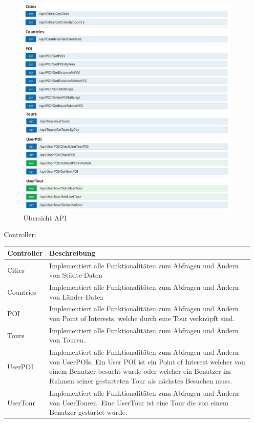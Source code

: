 \documentclass[a4paper,10pt,xetex]{article}
\begin{document}
\begin{figure}
  \centering
  \includegraphics{swagger}
  \caption{Übersicht API}
\end{figure}

Controller:

\begin{longtabu} to \textwidth { | l | X[l] | }
  \hline
  \textbf{Controller} & \textbf{Beschreibung} \\
  \hline
  \endhead

   Cities &
  Implementiert alle Funktionalit\"aten zum Abfragen und \"Andern von St\"adte-Daten\\ \hline
  Countries &
  Implementiert alle Funktionalit\"aten zum Abfragen und \"Andern von L\"ander-Daten\\ \hline
    POI &
  Implementiert alle Funktionalit\"aten zum Abfragen und \"Andern von Point of Interests, welche
    durch eine Tour verkn\"upft sind.\\\hline
  Tours &
  Implementiert alle Funktionalit\"aten zum Abfragen und \"Andern von Touren.\\\hline
    UserPOI &
  Implementiert alle Funktionalit\"aten zum Abfragen und \"Andern von UserPOIs. Ein User POI ist
    ein Point of Interest welcher von einem Benutzer besucht wurde oder welcher ein Benutzer im Rahmen seiner gestarteten
    Tour als n\"achstes Besuchen muss.\\\hline
  UserTour &
  Implementiert alle Funktionalit\"aten zum Abfragen und \"Andern von UserTouren. Eine UserTour
    ist eine Tour die von einem Benutzer gestartet wurde.\\\hline
\end{longtabu}
\end{document}
